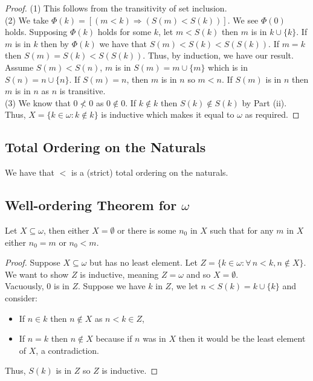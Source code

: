 \begin{proof}
    (1) This follows from the transitivity of set inclusion.
    \\[\baselineskip]
    (2) We take $\Phi(k) = [(m < k) \Rightarrow (S(m) < S(k))]$.
    We see $\Phi(0)$ holds. Supposing $\Phi(k)$ holds for some
    $k$, let $m < S(k)$ then $m$ is in $k \cup \{k\}$. If $m$ 
    is in $k$ then by $\Phi(k)$ we have that $S(m) < S(k) < S(S(k))$.
    If $m = k$ then $S(m) = S(k) < S(S(k))$. Thus, by induction, 
    we have our result.
    \\[\baselineskip]
    Assume $S(m) < S(n)$, $m$ is in $S(m) = m \cup \{m\}$ which
    is in $S(n) = n \cup \{n\}$. If $S(m) = n$, then $m$ is in $n$
    so $m < n$. If $S(m)$ is in $n$ then $m$ is in $n$ as $n$ is
    transitive.
    \\[\baselineskip]
    (3) We know that $0 \nless 0$ as $0 \notin 0$. If $k \notin k$
    then $S(k) \notin S(k)$ by Part (ii). Thus, 
    $X = \{k \in \omega : k \notin k\}$ is inductive which makes
    it equal to $\omega$ as required.
\end{proof}

\subsection{Total Ordering on the Naturals}

We have that $<$ is a (strict) total ordering on the naturals.

\subsection{Well-ordering Theorem for $\omega$}

Let $X \subseteq \omega$, then either $X = \emptyset$ or there is some
$n_0$ in $X$ such that for any $m$ in $X$ either $n_0 = m$ or $n_0 < m$.

\begin{proof}
    Suppose $X \subseteq \omega$ but has no least element.
    Let $Z = \{k \in \omega : \forall \, n < k, n \notin X\}$.
    We want to show $Z$ is inductive, meaning $Z = \omega$ and
    so $X = \emptyset$. 
    \\[\baselineskip]
    Vacuously, $0$ is in $Z$. Suppose we have $k$ in 
    $Z$, we let $n < S(k) = k \cup \{k\}$ and consider: \begin{itemize}
        \item If $n \in k$ then $n \notin X$ as $n < k \in Z$,
        \item If $n = k$ then $n \notin X$ because if $n$ was in $X$
            then it would be the least element of $X$, a contradiction.
    \end{itemize} Thus, $S(k)$ is in $Z$ so $Z$ is inductive.
\end{proof}

